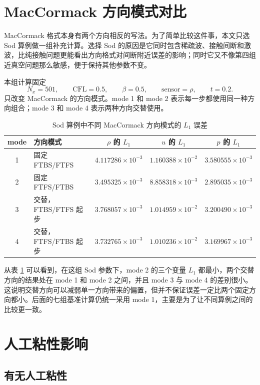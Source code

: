 \documentclass[UTF8,12pt,a4paper]{ctexart}
\begin{document}
\section{MacCormack 方向模式对比}

MacCormack 格式本身有两个方向相反的写法。为了简单比较这件事，本文只选 Sod 算例做一组补充计算。选择 Sod 的原因是它同时包含稀疏波、接触间断和激波，比纯接触问题更能看出方向格式对间断附近误差的影响；同时它又不像第四组近真空问题那么敏感，便于保持其他参数不变。

本组计算固定
\[
    N_x=501,\qquad
    \mathrm{CFL}=0.5,\qquad
    \beta=0.5,\qquad
    \mathrm{sensor}=\rho,\qquad
    t=0.2 .
\]
只改变 MacCormack 的方向模式。mode 1 和 mode 2 表示每一步都使用同一种方向组合；mode 3 和 mode 4 表示两种方向交替使用。

\begin{table}[H]
    \centering
    \caption{Sod 算例中不同 MacCormack 方向模式的 $L_1$ 误差}
    \label{tab:mode_compare}
    \begin{tabular}{clccc}
        \toprule
        mode & 方向模式 & $\rho$ 的 $L_1$ & $u$ 的 $L_1$ & $p$ 的 $L_1$ \\
        \midrule
        1 & 固定 FTBS/FTFS & $4.117286\times10^{-3}$ & $1.160388\times10^{-2}$ & $3.580555\times10^{-3}$ \\
        2 & 固定 FTFS/FTBS & $3.495325\times10^{-3}$ & $8.858318\times10^{-3}$ & $2.895035\times10^{-3}$ \\
        3 & 交替，FTBS/FTFS 起步 & $3.768057\times10^{-3}$ & $1.014959\times10^{-2}$ & $3.200490\times10^{-3}$ \\
        4 & 交替，FTFS/FTBS 起步 & $3.732765\times10^{-3}$ & $1.010236\times10^{-2}$ & $3.169967\times10^{-3}$ \\
        \bottomrule
    \end{tabular}
\end{table}

从表 \ref{tab:mode_compare} 可以看到，在这组 Sod 参数下，mode 2 的三个变量 $L_1$ 都最小，两个交替方向的结果处在 mode 1 和 mode 2 之间，并且 mode 3 与 mode 4 的差别很小。这说明交替方向可以减弱单一方向带来的偏置，但并不保证误差一定比两个固定方向都小。后面的七组基准计算仍统一采用 mode 1，主要是为了让不同算例之间的比较更一致。

\section{人工粘性影响}

\subsection{有无人工粘性}
\end{document}
